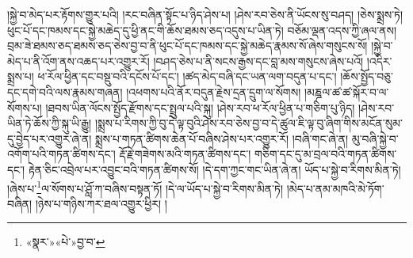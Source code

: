 །སྐྱེ་བ་མེད་པར་རྟོགས་གྱུར་པའི། །རང་བཞིན་སྟོང་པ་ཉིད་ཤེས་པ། །ཤེས་རབ་ཅེས་ནི་ཡོངས་སུ་བཤད། །ཅེས་སྨྲས་ཏེ། ཕུང་པོ་དང་ཁམས་དང་སྐྱེ་མཆེད་དུ་ཕྱི་ནང་གི་ཆོས་ཐམས་ཅད་འདུས་པ་ཡིན་ཏེ། བཅོམ་ལྡན་འདས་ཀྱི་ཞལ་ནས། བྲམ་ཟེ་ཐམས་ཅད་ཐམས་ཅད་ཅེས་བྱ་བ་ནི་ཕུང་པོ་དང་ཁམས་དང་སྐྱེ་མཆེད་རྣམས་སོ་ཞེས་གསུངས་སོ། །སྐྱེ་བ་མེད་པ་ནི་འོག་ནས་འཆད་པར་འགྱུར་རོ། །བཤད་ཅེས་པ་ནི་སངས་རྒྱས་དང་བླ་མས་གསུངས་ཞེས་པའོ། །འདིར་སྨྲས་པ། ཕ་རོལ་ཕྱིན་དང་བསྡུ་བའི་དངོས་པོ་དང་། །ཚད་མེད་བཞི་དང་ཡན་ལག་བདུན་པ་དང་། །ཆོས་སྤྱོད་བཅུ་དང་དགེ་བའི་ལས་རྣམས་གཞན། །འཕགས་པའི་ནོར་བདུན་རྗེས་དྲན་དྲུག་ལ་སོགས། །མཎྜལ་ཚ་ཚ་སྐོར་བ་ལ་སོགས་པ། །ཐབས་ཡིན་ལོངས་སྤྱོད་རྫོགས་དང་སྤྲུལ་པའི་སྐུ། །ཤེས་རབ་ཕ་རོལ་ཕྱིན་པ་གཅིག་པུ་ཉིད། །ཤེས་རབ་ཡིན་ཏེ་ཆོས་ཀྱི་སྐུ་ཡི་རྒྱུ། །སྨྲས་པ་རིགས་ཀྱི་བུ་དེ་ལྟ་བུའི་ཤེས་རབ་ཅེས་བྱ་བ་དེ་ཚུལ་ཇི་ལྟ་བུ་ཞིག་གིས་མངོན་སུམ་དུ་བྱེད་པར་འགྱུར་ཞེ་ན། སྨྲས་པ་གཏན་ཚིགས་ཆེན་པོ་བཞིས་ཤེས་པར་འགྱུར་རོ། །བཞི་གང་ཞེ་ན། མུ་བཞི་སྐྱེ་བ་འགོག་པའི་གཏན་ཚིགས་དང་། རྡོ་རྗེ་གཟེགས་མའི་གཏན་ཚིགས་དང་། གཅིག་དང་དུ་མ་བྲལ་བའི་གཏན་ཚིགས་དང་། རྟེན་ཅིང་འབྲེལ་པར་འབྱུང་བའི་གཏན་ཚིགས་སོ། །དེ་དག་ཀྱང་གང་ཡིན་ཞེ་ན། ཡོད་པ་སྐྱེ་བ་རིགས་མིན་ཏེ། །ཞེས་པ་\footnote{«སྣར་»«པེ་»བྱ་བ་}ལ་སོགས་པ་ཤློ་ཀ་བཞིས་བསྟན་ཏོ། །དེ་ལ་ཡོད་པ་སྐྱེ་བ་རིགས་མིན་ཏེ། །མེད་པ་ནམ་མཁའི་མེ་ཏོག་བཞིན། །ཉེས་པ་གཉིས་ཀར་ཐལ་འགྱུར་ཕྱིར། །
